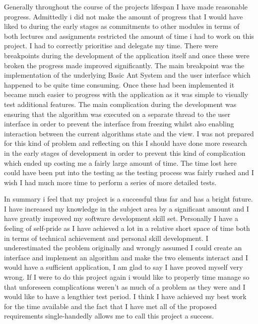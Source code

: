Generally throughout the course of the projects lifespan I have made reasonable progress. Admittedly i did not make the amount of progress that I would have liked to during the early stages as commitments to other modules in terms of both lectures and assignments restricted the amount of time i had to work on this project. I had to correctly prioritise and delegate my time. There were breakpoints during the development of the application itself and once these were broken the progress made improved significantly. The main breakpoint was the implementation of the underlying Basic Ant System and the user interface which happened to be quite time consuming. Once these had been implemented it became much easier to progress with the application as it was simple to visually test additional features. The main complication during the development was ensuring that the algorithm was executed on a separate thread to the user interface in order to prevent the interface from freezing whilst also enabling interaction between the current algorithms state and the view. I was not prepared for this kind of problem and reflecting on this I should have done more research in the early stages of development in order to prevent this kind of complication which ended up costing me a fairly large amount of time. The time lost here could have been put into the testing as the testing process was fairly rushed and I wish I had much more time to perform a series of more detailed tests.

In summary i feel that my project is a successful thus far and has a bright future. I have increased my knowledge in the subject area by a significant amount and I have greatly improved my software development skill set. Personally I have a feeling of self-pride as I have achieved a lot in a relative short space of time both in terms of technical achievement and personal skill development. I underestimated the problem originally and wrongly assumed I could create an interface and implement an algorithm and make the two elements interact and I would have a sufficient application, I am glad to say I have proved myself very wrong. If I were to do this project again i would like to properly time manage so that unforeseen complications weren’t as much of a problem as they were and I would like to have a lengthier test period. I think I have achieved my best work for the time available and the fact that I have met all of the proposed requirements single-handedly allows me to call this project a success.